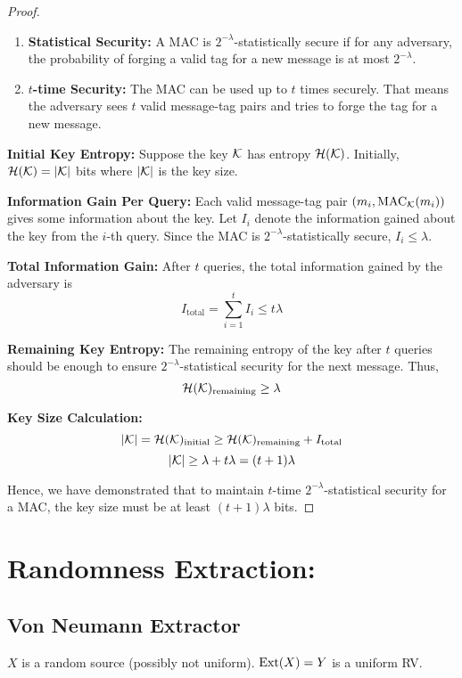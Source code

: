 \begin{proof}
	
\begin{enumerate}
	\item \textbf{Statistical Security:} A MAC is $2^{-\lambda}$-statistically secure if for any adversary, the probability of forging a valid tag for a new message is at most $2^{-\lambda}$.
	
	\item \textbf{$t$-time Security:} The MAC can be used up to $t$ times securely. That means the adversary sees $t$ valid message-tag pairs and tries to forge the tag for a new message.
\end{enumerate}

\textbf{Initial Key Entropy:} Suppose the key $\mathcal{K}$ has entropy $\mathcal{H}(\mathcal{K})$. Initially, $\mathcal{H}(\mathcal{K}) = |\mathcal{K}|$ bits where $|\mathcal{K}|$ is the key size.

\textbf{Information Gain Per Query:} Each valid message-tag pair $(m_i, \text{MAC}_{\mathcal{K}}(m_i))$ gives some information about the key. Let $I_i$ denote the information gained about the key from the $i$-th query. Since the MAC is $2^{-\lambda}$-statistically secure, $I_i \leq \lambda$.

\textbf{Total Information Gain:} After $t$ queries, the total information gained by the adversary is 
\[ 
I_{\text{total}} = \sum_{i=1}^t I_i \leq t \lambda 
\]

\textbf{Remaining Key Entropy:} The remaining entropy of the key after $t$ queries should be enough to ensure $2^{-\lambda}$-statistical security for the next message. Thus, 
\[ 
\mathcal{H}(\mathcal{K})_{\text{remaining}} \geq \lambda 
\]

\textbf{Key Size Calculation:}
\[ 
|\mathcal{K}| = \mathcal{H}(\mathcal{K})_{\text{initial}} \geq\mathcal{H}(\mathcal{K})_{\text{remaining}} + I_{\text{total}}
\]
\[ 
|\mathcal{K}| \geq \lambda + t \lambda = (t+1) \lambda 
\]

Hence, we have demonstrated that to maintain $t$-time $2^{-\lambda}$-statistical security for a MAC, the key size must be at least $(t+1)\lambda$ bits.

\end{proof}




\section{Randomness Extraction: }
\subsection*{Von Neumann Extractor}
$X$ is a random source (possibly not uniform).
$\mathrm{Ext}(X) = Y$ is a uniform \ac{RV}.

